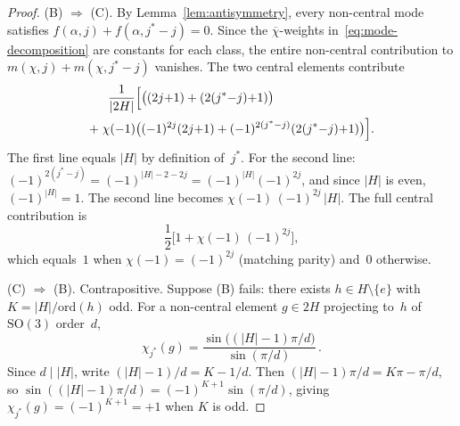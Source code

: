 \documentclass[12pt]{article}
\theoremstyle{definition}
\theoremstyle{remark}
\newcommand{\SO}{\mathrm{SO}}
\begin{document}
\begin{proof}
  \textup{(B) $\Rightarrow$ (C).}
  By Lemma~\ref{lem:antisymmetry}, every non-central
  mode satisfies
  $f(\alpha, j) + f(\alpha, j^*{-}j) = 0$.
  Since the $\overline{\chi}$-weights
  in~\eqref{eq:mode-decomposition} are constants
  for each class, the entire non-central contribution
  to $m(\chi, j) + m(\chi, j^*{-}j)$ vanishes.
  The two central elements contribute
  \begin{align*}
    \frac{1}{|2H|}\Bigl[
      &\bigl((2j{+}1) + (2(j^*{-}j){+}1)\bigr) \\
      +\;\chi(-1)\bigl(
        &(-1)^{2j}(2j{+}1)
        + (-1)^{2(j^*-j)}(2(j^*{-}j){+}1)
      \bigr)
    \Bigr].
  \end{align*}
  The first line equals $|H|$ by definition of~$j^*$.
  For the second line:
  $(-1)^{2(j^*-j)} = (-1)^{|H|-2-2j}
  = (-1)^{|H|}(-1)^{2j}$,
  and since $|H|$ is even, $(-1)^{|H|} = 1$.
  The second line becomes
  $\chi(-1)\,(-1)^{2j}\,|H|$.
  The full central contribution is
  \begin{equation}
    \label{eq:central}
    \frac{1}{2}
    \bigl[1 + \chi(-1)\,(-1)^{2j}\bigr],
  \end{equation}
  which equals~$1$ when $\chi(-1) = (-1)^{2j}$
  (matching parity) and~$0$ otherwise.

  \medskip
  \textup{(C) $\Rightarrow$ (B).}
  Contrapositive.
  Suppose (B) fails: there exists $h \in H \setminus \{e\}$
  with $K = |H|/\mathrm{ord}(h)$ odd.
  For a non-central element $g \in 2H$ projecting to~$h$
  of $\SO(3)$ order~$d$,
  \begin{equation}
    \label{eq:chi-jstar}
    \chi_{j^*}(g)
    = \frac{\sin\bigl((|H|{-}1)\pi/d\bigr)}
           {\sin(\pi/d)}\,.
  \end{equation}
  Since $d \mid |H|$, write $(|H|{-}1)/d = K - 1/d$.
  Then $(|H|{-}1)\pi/d = K\pi - \pi/d$, so
  $\sin((|H|{-}1)\pi/d) = (-1)^{K+1}\sin(\pi/d)$,
  giving $\chi_{j^*}(g) = (-1)^{K+1} = +1$ when $K$ is odd.


\end{proof}
\end{document}
